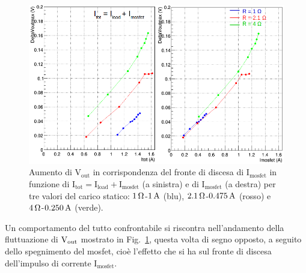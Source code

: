\begin{figure}
\centering
\includegraphics[width=0.9\linewidth]{Immagini/VoutOver}
\caption{Aumento di $\mathrm{V_{out}}$ in corrispondenza del fronte di discesa di $\mathrm{I_{mosfet}}$ in funzione di $\mathrm{I_{tot} = I_{load}+I_{mosfet}}$ (a sinistra) e di $\mathrm{I_{mosfet}}$ (a destra) per tre valori del carico statico: $1{\rm \, \Omega}$-$1\rm \, A$ (blu), $2.1{\rm \, \Omega}$-$0.475\rm \, A$ (rosso) e $4{\rm \, \Omega}$-$0.250\rm \, A$ (verde).}
\label{VoutOver}
\end{figure}

Un comportamento del tutto confrontabile si riscontra nell'andamento della fluttuazione di $\mathrm{V_{out}}$ mostrato in Fig.~\ref{VoutOver}, questa volta di segno opposto, a seguito dello spegnimento del mosfet, cioè l'effetto che si ha sul fronte di discesa dell'impulso di corrente $\mathrm{I_{mosfet}}$.

